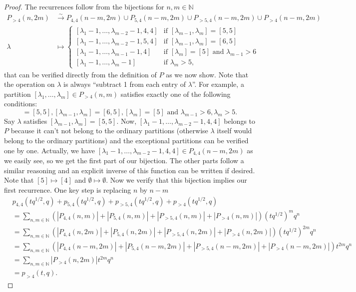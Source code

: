 \documentclass[12pt,a4paper]{article}
\begin{document}
\begin{proof}
  The recurrences follow from the bijections for $n,m\in \mathbb{N}$
  \begin{align*}
    P_{>4}(n,2m)&\xrightarrow{\sim} P_{4,4}(n-m,2m)\cup P_{5,4}(n-m,2m)\cup P_{>5,4}(n-m,2m)\cup P_{>4}(n-m,2m) \\
    \lambda&\mapsto
             \begin{cases}
               [\lambda_1-1, \dots, \lambda_{m-2}-1, 4, 4] & \text{if } [\lambda_{m-1},\lambda_m]=[5, 5] \\
               [\lambda_1-1, \dots, \lambda_{m-2}-1, 5, 4] & \text{if } [\lambda_{m-1},\lambda_m]=[6, 5] \\
               [\lambda_1-1, \dots, \lambda_{m-1}-1, 4] & \text{if } [\lambda_m]=[5] \text{ and } \lambda_{m-1}>6 \\
               [\lambda_1-1, \dots, \lambda_m-1] & \text{if } \lambda_m>5,
             \end{cases}
  \end{align*}
  that can be verified directly from the definition of $P$ as we now show.
  Note that the operation on $\lambda$ is always ``subtract 1 from each entry of $\lambda$''.
  For example, a partition $[\lambda_1,\dots,\lambda_m]\in P_{>4}(n,m)$ satisfies exactly one of the following conditions:
  \begin{equation*}
    [\lambda_{m-1},\lambda_m]=[5,5], [\lambda_{m-1},\lambda_m]=[6,5], [\lambda_m]=[5] \text{ and } \lambda_{m-1}>6, \lambda_m>5.
  \end{equation*}
  Say $\lambda$ satisfies $[\lambda_{m-1},\lambda_m]=[5,5]$.
  Now, $[\lambda_1-1, \dots, \lambda_{m-2}-1, 4, 4]$ belongs to $P$ because it can't not belong to the ordinary partitions (otherwise $\lambda$ itself would belong to the ordinary partitions) and the exceptional partitions can be verified one by one.
  Actually, we have $[\lambda_1-1, \dots, \lambda_{m-2}-1, 4, 4]\in P_{4,4}(n-m,2m)$ as we easily see, so we get the first part of our bijection.
  The other parts follow a similar reasoning and an explicit inverse of this function can be written if desired.
  Note that $[5]\mapsto [4]$ and $\emptyset\mapsto \emptyset$.
  Now we verify that this bijection implies our first recurrence.
  One key step is replacing $n$ by $n-m$
  \begin{align*}
    &p_{4,4}(tq^{1/2},q)+p_{5,4}(tq^{1/2},q)+p_{>5,4}(tq^{1/2},q)+p_{>4}(tq^{1/2},q) \\
    &=\sum_{n,m\in \mathbb{N}}(|P_{4,4}(n,m)|+|P_{5,4}(n,m)|+|P_{>5,4}(n,m)|+|P_{>4}(n,m)|)(tq^{1/2})^mq^n \\
    &=\sum_{n,m\in \mathbb{N}}(|P_{4,4}(n,2m)|+|P_{5,4}(n,2m)|+|P_{>5,4}(n,2m)|+|P_{>4}(n,2m)|)(tq^{1/2})^{2m}q^n \\
    &=\sum_{n,m\in \mathbb{N}}(|P_{4,4}(n-m,2m)|+|P_{5,4}(n-m,2m)|+|P_{>5,4}(n-m,2m)|+|P_{>4}(n-m,2m)|)t^{2m}q^n \\
    &=\sum_{n,m\in \mathbb{N}}|P_{>4}(n,2m)|t^{2m}q^n \\
    &=p_{>4}(t,q).
  \end{align*}
  

\end{proof}
\end{document}
